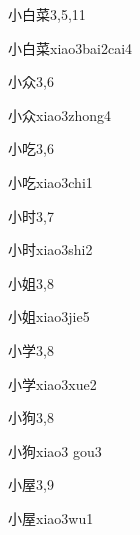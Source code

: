 \begin{entry}{小白菜}{3,5,11}
  \begin{phonetics}{小白菜}{xiao3bai2cai4}
  \end{phonetics}
\end{entry}

\begin{entry}{小众}{3,6}
  \begin{phonetics}{小众}{xiao3zhong4}
  \end{phonetics}
\end{entry}

\begin{entry}{小吃}{3,6}
  \begin{phonetics}{小吃}{xiao3chi1}
  \end{phonetics}
\end{entry}

\begin{entry}{小时}{3,7}
  \begin{phonetics}{小时}{xiao3shi2}
  \end{phonetics}
\end{entry}

\begin{entry}{小姐}{3,8}
  \begin{phonetics}{小姐}{xiao3jie5}
  \end{phonetics}
\end{entry}

\begin{entry}{小学}{3,8}
  \begin{phonetics}{小学}{xiao3xue2}
  \end{phonetics}
\end{entry}

\begin{entry}{小狗}{3,8}
  \begin{phonetics}{小狗}{xiao3 gou3}
  \end{phonetics}
\end{entry}

\begin{entry}{小屋}{3,9}
  \begin{phonetics}{小屋}{xiao3wu1}
  \end{phonetics}
\end{entry}

